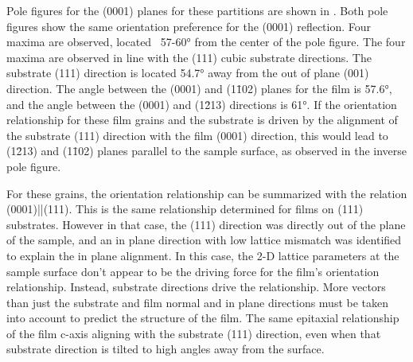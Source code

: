 Pole figures for the (0001) planes for these partitions are shown in
. Both pole figures show the same orientation preference
for the (0001) reflection. Four maxima are observed, located ~57-60\si{\degree} from the
center of the pole figure. The four maxima are observed in line with the (111) cubic
substrate directions. The substrate (111) direction is located 54.7\si{\degree} away from
the out of plane (001) direction. The angle between the (0001) and (1\={1}02) planes for
the  film is 57.6\si{\degree}, and the angle between the (0001) and (1\={2}13)
directions is 61\si{\degree}. If the orientation relationship for these film grains and
the substrate is driven by the alignment of the substrate (111) direction with the film
(0001) direction, this would lead to (1\={2}13) and (1\={1}02) planes parallel to the
sample surface, as observed in the inverse pole figure. 

For these grains, the orientation relationship can be summarized with the relation
(0001)||(111).  This is the same relationship determined for films on
(111) substrates. However in that case, the (111) direction was directly out of
the plane of the sample, and an in plane direction with low lattice mismatch was
identified to explain the in plane alignment. In this case, the 2-D lattice parameters at
the sample surface don't appear to be the driving force for the film's orientation
relationship. Instead, substrate directions drive the relationship. More vectors than just
the substrate and film normal and in plane directions must be taken into account to
predict the structure of the film. The same epitaxial relationship of the film c-axis
aligning with the substrate (111) direction, even when that substrate direction is tilted
to high angles away from the surface.

